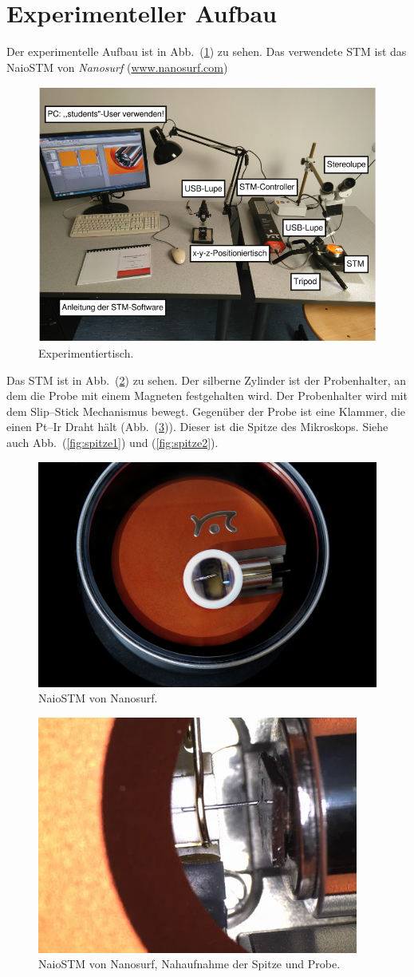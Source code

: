 \documentclass[sn-mathphys-num,iicol]{sn-jnl}
\theoremstyle{thmstyleone}
\theoremstyle{thmstyletwo}
\theoremstyle{thmstylethree}
\begin{document}
\section{Experimenteller Aufbau}
Der experimentelle Aufbau ist in Abb.\ (\ref{fig:aufbau}) zu sehen.
Das verwendete STM ist das \glqq NaioSTM\grqq{} von \textit{Nanosurf} (\url{www.nanosurf.com})
\begin{figure}[t]
  \centering
  \includegraphics[width=.5\textwidth]{422_aufbau.png}
  \caption{Experimentiertisch.\cite{anleitung422}} \label{fig:aufbau}
\end{figure}
Das STM ist in Abb.\ (\ref{fig:naiostm}) zu sehen.
Der silberne Zylinder ist der Probenhalter, an dem die Probe mit einem Magneten festgehalten wird.
Der Probenhalter wird mit dem Slip--Stick Mechanismus bewegt.
Gegenüber der Probe ist eine Klammer, die einen Pt--Ir Draht hält (Abb.\ (\ref{fig:naiostm_closeup})).
Dieser ist die Spitze des Mikroskops.
Siehe auch Abb.\ (\ref{fig:spitze1}) und (\ref{fig:spitze2}).
\begin{figure}[t]
  \centering
  \includegraphics[width=.5\textwidth]{422_naiostm.png}
  \caption{NaioSTM von Nanosurf.\cite{nanosurf}} \label{fig:naiostm}
\end{figure}
\begin{figure}[t]
  \centering
  \includegraphics[width=.5\textwidth]{422_naiostm_closeup.png}
  \caption{NaioSTM von Nanosurf, Nahaufnahme der Spitze und Probe.\cite{nanosurf}} \label{fig:naiostm_closeup}
\end{figure}
\end{document}
